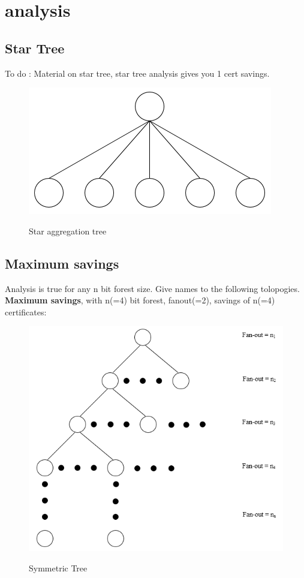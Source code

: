 \chapter{analysis}

\section{Star Tree}
	
	To do : Material on star tree, star tree analysis gives you 1 cert savings.

	\begin{figure}[H]\label{star-aggregation-tree}
  	\centering
  		\includegraphics[scale=0.4]{images/star-tree.png}\\
  		\caption{Star aggregation tree}
  \end{figure}

\newpage

\section{Maximum savings}
	Analysis is true for any n bit forest size.	Give names to the following tolopogies.  
	\textbf{Maximum savings}, with n(=4) bit forest, fanout(=2), savings of n(=4) certificates:

	\begin{figure}[hp]
		\centering
		\includegraphics[scale=0.5]{images/symmetric-tree.png}\\
		\caption{Symmetric Tree}
	\end{figure}

